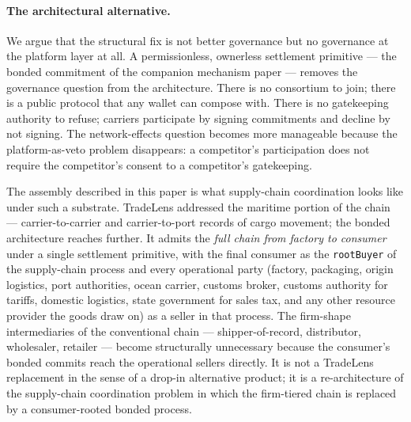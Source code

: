 \documentclass[11pt,a4paper]{article}
\theoremstyle{definition}
\theoremstyle{remark}
\begin{document}
\paragraph{The architectural alternative.}
We argue that the structural fix is not better governance but no
governance at the platform layer at all. A permissionless,
ownerless settlement primitive --- the bonded commitment of the
companion mechanism paper --- removes the governance question from
the architecture. There is no consortium to join; there is a
public protocol that any wallet can compose with. There is no
gatekeeping authority to refuse; carriers participate by signing
commitments and decline by not signing. The network-effects
question becomes more manageable because the platform-as-veto
problem disappears: a competitor's participation does not require
the competitor's consent to a competitor's gatekeeping.

The assembly described in this paper is what supply-chain
coordination looks like under such a substrate. TradeLens
addressed the maritime portion of the chain --- carrier-to-carrier
and carrier-to-port records of cargo movement; the bonded
architecture reaches further. It admits the \emph{full chain from
factory to consumer} under a single settlement primitive, with
the final consumer as the \texttt{rootBuyer} of the supply-chain
process and every operational party (factory, packaging, origin
logistics, port authorities, ocean carrier, customs broker,
customs authority for tariffs, domestic logistics, state
government for sales tax, and any other resource provider the
goods draw on) as a seller in that process. The firm-shape
intermediaries of the conventional chain --- shipper-of-record,
distributor, wholesaler, retailer --- become structurally
unnecessary because the consumer's bonded commits reach the
operational sellers directly. It is not a TradeLens replacement
in the sense of a drop-in alternative product; it is a
re-architecture of the supply-chain coordination problem in which
the firm-tiered chain is replaced by a consumer-rooted bonded
process.
\end{document}
